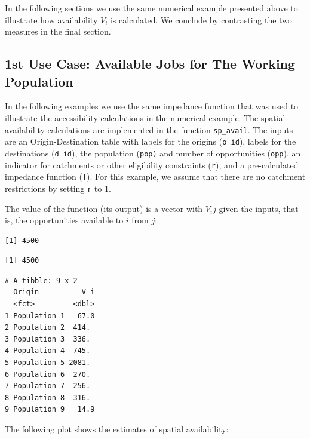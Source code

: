 \documentclass[]{elsarticle} %
\begin{document}
In the following sections we use the same numerical example presented
above to illustrate how availability \(V_i\) is calculated. We conclude
by contrasting the two measures in the final section.

\hypertarget{st-use-case-available-jobs-for-the-working-population}{%
\subsection{1st Use Case: Available Jobs for The Working
Population}\label{st-use-case-available-jobs-for-the-working-population}}

In the following examples we use the same impedance function that was
used to illustrate the accessibility calculations in the numerical
example. The spatial availability calculations are implemented in the
function \texttt{sp\_avail}. The inputs are an Origin-Destination table
with labels for the origins (\texttt{o\_id}), labels for the
destinations (\texttt{d\_id}), the population (\texttt{pop)} and number
of opportunities (\texttt{opp}), an indicator for catchments or other
eligibility constraints (\texttt{r}), and a pre-calculated impedance
function (\texttt{f}). For this example, we assume that there are no
catchment restrictions by setting \texttt{r} to 1.

The value of the function (its output) is a vector with \(V_ij\) given
the inputs, that is, the opportunities available to \(i\) from \(j\):

\begin{verbatim}
[1] 4500
\end{verbatim}

\begin{verbatim}
[1] 4500
\end{verbatim}

\begin{verbatim}
# A tibble: 9 x 2
  Origin          V_i
  <fct>         <dbl>
1 Population 1   67.0
2 Population 2  414. 
3 Population 3  336. 
4 Population 4  745. 
5 Population 5 2081. 
6 Population 6  270. 
7 Population 7  256. 
8 Population 8  316. 
9 Population 9   14.9
\end{verbatim}

The following plot shows the estimates of spatial availability:
\end{document}
